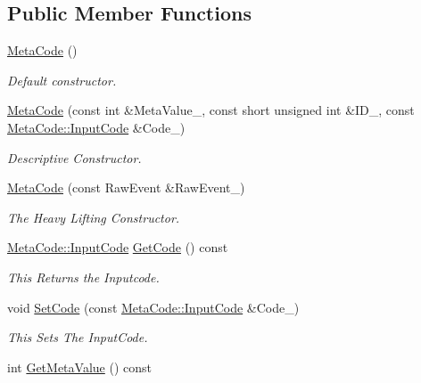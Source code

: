 \subsection*{Public Member Functions}
\begin{DoxyCompactItemize}
\item 
\hyperlink{classMetaCode_a6d4637b2894e5a2d46577c08259a2416}{MetaCode} ()
\begin{DoxyCompactList}\small\item\em Default constructor. \item\end{DoxyCompactList}\item 
\hyperlink{classMetaCode_aaa5c96e46212847295db722a8253e86a}{MetaCode} (const int \&MetaValue\_\-, const short unsigned int \&ID\_\-, const \hyperlink{classMetaCode_a7390e6f58e25c0ce377bba4e63081b24}{MetaCode::InputCode} \&Code\_\-)
\begin{DoxyCompactList}\small\item\em Descriptive Constructor. \item\end{DoxyCompactList}\item 
\hyperlink{classMetaCode_a87b260ce7ee3a66c75320c0fc37cdc0a}{MetaCode} (const RawEvent \&RawEvent\_\-)
\begin{DoxyCompactList}\small\item\em The Heavy Lifting Constructor. \item\end{DoxyCompactList}\item 
\hyperlink{classMetaCode_a7390e6f58e25c0ce377bba4e63081b24}{MetaCode::InputCode} \hyperlink{classMetaCode_a94532fc103d95f3de53eeccbadd6f17b}{GetCode} () const 
\begin{DoxyCompactList}\small\item\em This Returns the Inputcode. \item\end{DoxyCompactList}\item 
void \hyperlink{classMetaCode_a9be5fcad22449c12b649801ab97bbf20}{SetCode} (const \hyperlink{classMetaCode_a7390e6f58e25c0ce377bba4e63081b24}{MetaCode::InputCode} \&Code\_\-)
\begin{DoxyCompactList}\small\item\em This Sets The InputCode. \item\end{DoxyCompactList}\item 
int \hyperlink{classMetaCode_a8d9cd9709ab51323d7061cf7b0ea4ee2}{GetMetaValue} () const 

\end{DoxyCompactItemize}
